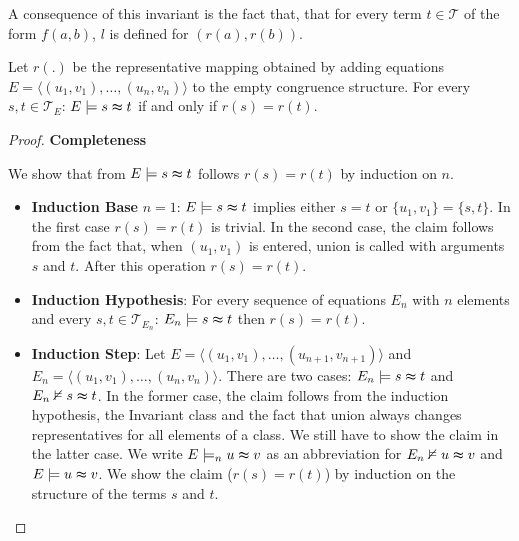 A consequence of this invariant is the fact that, that for every term $t \in \mathcal{T}$ of the form $f(a,b)$, $l$ is defined for $(r(a),r(b))$.

\begin{proposition}

Let $r(.)$ be the representative mapping obtained by adding equations $E = \langle (u_1,v_1), \ldots, (u_n,v_n) \rangle $ to the empty congruence structure.
For every $s,t \in \mathcal{T}_E$: $E \models s \thickapprox t$ if and only if $r(s) = r(t)$.

\end{proposition}

\begin{proof}
\textbf{Completeness}

\noindent We show that from $E \models s \thickapprox t$ follows $r(s) = r(t)$ by induction on $n$.

\begin{itemize}
\item \textbf{Induction Base} $n=1$: $E \models s \thickapprox t$ implies either $s = t$ or $\{u_1,v_1\} = \{s,t\}$.
In the first case $r(s) = r(t)$ is trivial. 
In the second case, the claim follows from the fact that, when $(u_1,v_1)$ is entered, union is called with arguments $s$ and $t$.
After this operation $r(s) = r(t)$.

\item \textbf{Induction Hypothesis}: For every sequence of equations $E_n$ with $n$ elements and every $s,t \in \mathcal{T}_{E_n}$: $E_n \models s \thickapprox t$ then $r(s) = r(t)$.

\item \textbf{Induction Step}: Let $E = \langle (u_1,v_1), \ldots, (u_{n+1},v_{n+1}) \rangle$ and $E_n = \langle (u_1,v_1), \ldots, (u_n,v_n) \rangle$.
There are two cases: $E_n \models s\thickapprox t$ and $E_n \nvDash s\thickapprox t$.
In the former case, the claim follows from the induction hypothesis, the Invariant class and the fact that union always changes representatives for all elements of a class.
We still have to show the claim in the latter case.
We write $E \models_n u \thickapprox v$ as an abbreviation for $E_n \nvDash u \thickapprox v$ and $E \models u \thickapprox v$.
We show the claim ($r(s) = r(t)$) by induction on the structure of the terms $s$ and $t$.


\end{itemize}
\end{proof}
